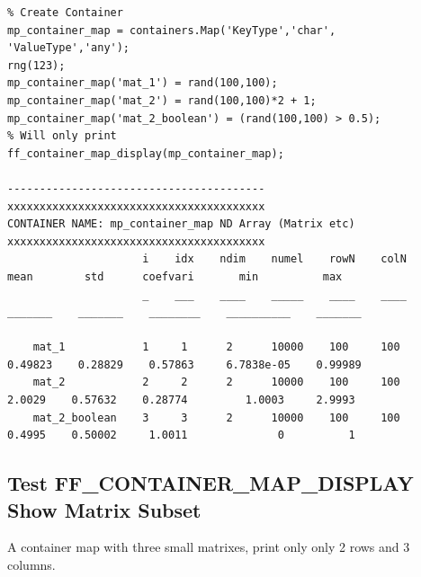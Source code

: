 \documentclass[
]{book}
\begin{document}
\begin{verbatim}
% Create Container
mp_container_map = containers.Map('KeyType','char', 'ValueType','any');
rng(123);
mp_container_map('mat_1') = rand(100,100);
mp_container_map('mat_2') = rand(100,100)*2 + 1;
mp_container_map('mat_2_boolean') = (rand(100,100) > 0.5);
% Will only print 
ff_container_map_display(mp_container_map);

----------------------------------------
xxxxxxxxxxxxxxxxxxxxxxxxxxxxxxxxxxxxxxxx
CONTAINER NAME: mp_container_map ND Array (Matrix etc)
xxxxxxxxxxxxxxxxxxxxxxxxxxxxxxxxxxxxxxxx
                     i    idx    ndim    numel    rowN    colN     mean        std      coefvari       min          max  
                     _    ___    ____    _____    ____    ____    _______    _______    ________    __________    _______

    mat_1            1     1      2      10000    100     100     0.49823    0.28829    0.57863     6.7838e-05    0.99989
    mat_2            2     2      2      10000    100     100      2.0029    0.57632    0.28774         1.0003     2.9993
    mat_2_boolean    3     3      2      10000    100     100      0.4995    0.50002     1.0011              0          1
\end{verbatim}

\hypertarget{test-ff_container_map_display-show-matrix-subset}{%
\subsection{Test FF\_CONTAINER\_MAP\_DISPLAY Show Matrix Subset}\label{test-ff_container_map_display-show-matrix-subset}}

A container map with three small matrixes, print only only 2 rows and 3
columns.
\end{document}
